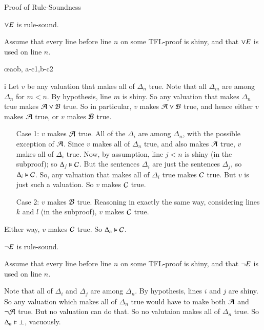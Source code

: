 \documentclass[12pt, a4paper, twoside, openright, titlepage]{book}
\begin{document}
\begin{proof*}{Proof of Rule-Soundness}{}
    \begin{claim*}{5}{}
        $\vee E$ is rule-sound.
    \end{claim*}
    Assume that every line before line $n$ on some TFL-proof is shiny, and that $\vee E$ is used on line $n$.
	\begin{fitchproof}
	   \open
	   \close
	   \open
	   \close
	   \oe{aob, a-c1,b-c2}
   \end{fitchproof}i
    Let $v$ be any valuation that makes all of $\Delta_n$ true. Note that all $\Delta_m$ are among $\Delta_n$ for $m < n$. By hypothesis, line $m$ is shiny. So any valuation that makes $\Delta_n$ true makes $\mathcal{A}\vee\mathcal{B}$ true. So in particular, $v$ makes $\mathcal{A}\vee \mathcal{B}$ true, and hence either $v$ makes $\mathcal{A}$ true, or $v$ makes $\mathcal{B}$ true. \begin{itemize}[leftmargin=+1in]
        \item[Case 1:] $v$ makes $\mathcal{A}$ true. All of the $\Delta_i$ are among $\Delta_n$, with the possible exception of $\mathcal{A}$. Since $v$ makes all of $\Delta_n$ true, and also makes $\mathcal{A}$ true, $v$ makes all of $\Delta_i$ true. Now, by assumption, line $j < n$ is shiny (in the subproof); so $\Delta_j\vDash \mathcal{C}$. But the sentences $\Delta_i$ are just the sentences $\Delta_j$, so $\Delta_i \vDash \mathcal{C}$. So, any valuation that makes all of $\Delta_i$ true makes $\mathcal{C}$ true. But $v$ is just such a valuation. So $v$ makes $\mathcal{C}$ true.
        \item[Case 2:] $v$ makes $\mathcal{B}$ true. Reasoning in exactly the same way, considering lines $k$ and $l$ (in the subproof), $v$ makes $\mathcal{C}$ true.
    \end{itemize}
    Either way, $v$ makes $\mathcal{C}$ true. So $\Delta_n\vDash \mathcal{C}$.


    \begin{claim*}{6}{}
        $\neg E$ is rule-sound.
    \end{claim*}
    Assume that every line before line $n$ on some TFL-proof is shiny, and that $\neg E$ is used on line $n$.
    \begin{fitchproof}
         
    \end{fitchproof}
    Note that all of $\Delta_i$ and $\Delta_j$ are among $\Delta_n$. By hypothesis, lines $i$ and $j$ are shiny. So any valuation which makes all of $\Delta_n$ true would have to make both $\mathcal{A}$ and $\neg\mathcal{A}$ true. But no valuation can do that. So no valutaion makes all of $\Delta_n$ true. So $\Delta_n \vDash \bot$, vacuously.



\end{proof*}
\end{document}
